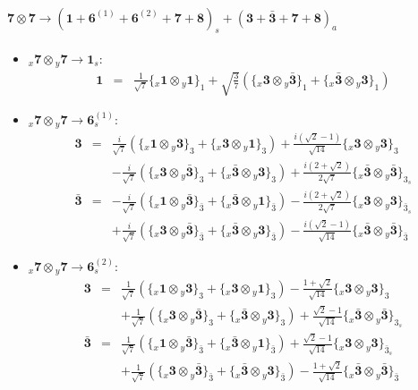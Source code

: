 \documentclass[english]{article}
\newcommand{\rep}[1]{\mathbf{#1}}
\newcommand{\repx}[2]{{}_{#2}\mathbf{#1}}
\newcommand{\subcg}[3]{\big\{ \repx{#1}{x}\otimes\repx{#2}{y}\big\}^{}_{#3}}
\begin{document}
\paragraph*{\Large $\rep{7}\otimes\rep{7}\to\left(\rep{1}+\rep{6}^{(1)}+\rep{6}^{(2)}+\rep{7}+\rep{8}\right)_s+\left(\rep{3}+\rep{\bar{3}}+\rep{7}+\rep{8}\right)_a$}
\begin{itemize}
\item $\repx{7}{x}\otimes\repx{7}{y}\to\rep{1}_{s}$:
\begin{eqnarray*}
\rep{1} &=& \frac{1}{\sqrt{7}}\subcg{1}{1}{1}+\sqrt{\frac{3}{7}}\left(\subcg{3}{\bar{3}}{1}+\subcg{\bar{3}}{3}{1}\right)
\end{eqnarray*}
\item $\repx{7}{x}\otimes\repx{7}{y}\to\rep{6}_{s}^{(1)}$:
\begin{eqnarray*}
\rep{3} &=& \frac{i}{\sqrt{7}}\left(\subcg{1}{3}{3}+\subcg{3}{1}{3}\right)+\frac{i \left(\sqrt{2}-1\right)}{\sqrt{14}}\subcg{3}{3}{3} \\ 
 & & -\frac{i}{\sqrt{7}}\left(\subcg{3}{\bar{3}}{3}+\subcg{\bar{3}}{3}{3}\right)+\frac{i \left(2+\sqrt{2}\right)}{2 \sqrt{7}}\subcg{\bar{3}}{\bar{3}}{3_{s}}
\\
\rep{\bar{3}} &=& -\frac{i}{\sqrt{7}}\left(\subcg{1}{\bar{3}}{\bar{3}}+\subcg{\bar{3}}{1}{\bar{3}}\right)-\frac{i \left(2+\sqrt{2}\right)}{2 \sqrt{7}}\subcg{3}{3}{\bar{3}_{s}} \\ 
 & & +\frac{i}{\sqrt{7}}\left(\subcg{3}{\bar{3}}{\bar{3}}+\subcg{\bar{3}}{3}{\bar{3}}\right)-\frac{i \left(\sqrt{2}-1\right)}{\sqrt{14}}\subcg{\bar{3}}{\bar{3}}{\bar{3}}
\end{eqnarray*}
\item $\repx{7}{x}\otimes\repx{7}{y}\to\rep{6}_{s}^{(2)}$:
\begin{eqnarray*}
\rep{3} &=& \frac{1}{\sqrt{7}}\left(\subcg{1}{3}{3}+\subcg{3}{1}{3}\right)-\frac{1+\sqrt{2}}{\sqrt{14}}\subcg{3}{3}{3} \\ 
 & & +\frac{1}{\sqrt{7}}\left(\subcg{3}{\bar{3}}{3}+\subcg{\bar{3}}{3}{3}\right)+\frac{\sqrt{2}-1}{\sqrt{14}}\subcg{\bar{3}}{\bar{3}}{3_{s}}
\\
\rep{\bar{3}} &=& \frac{1}{\sqrt{7}}\left(\subcg{1}{\bar{3}}{\bar{3}}+\subcg{\bar{3}}{1}{\bar{3}}\right)+\frac{\sqrt{2}-1}{\sqrt{14}}\subcg{3}{3}{\bar{3}_{s}} \\ 
 & & +\frac{1}{\sqrt{7}}\left(\subcg{3}{\bar{3}}{\bar{3}}+\subcg{\bar{3}}{3}{\bar{3}}\right)-\frac{1+\sqrt{2}}{\sqrt{14}}\subcg{\bar{3}}{\bar{3}}{\bar{3}}
\end{eqnarray*}

\end{itemize}
\end{document}
